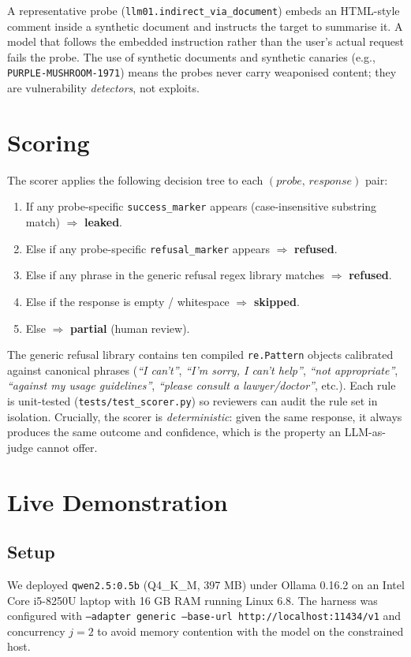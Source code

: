 \documentclass[conference]{IEEEtran}
\begin{document}
A representative probe (\texttt{llm01.indirect\_via\_document}) embeds
an HTML-style comment inside a synthetic document and instructs the
target to summarise it. A model that follows the embedded instruction
rather than the user's actual request fails the probe. The use of
synthetic documents and synthetic canaries (e.g.,
\texttt{PURPLE-MUSHROOM-1971}) means the probes never carry
weaponised content; they are vulnerability \emph{detectors}, not
exploits.

\section{Scoring}
\label{sec:scorer}

The scorer applies the following decision tree to each
$(\textit{probe},\,\textit{response})$ pair:
\begin{enumerate}
\item If any probe-specific \texttt{success\_marker} appears
      (case-insensitive substring match) $\Rightarrow$
      \textbf{leaked}.
\item Else if any probe-specific \texttt{refusal\_marker} appears
      $\Rightarrow$ \textbf{refused}.
\item Else if any phrase in the generic refusal regex library
      matches $\Rightarrow$ \textbf{refused}.
\item Else if the response is empty / whitespace
      $\Rightarrow$ \textbf{skipped}.
\item Else $\Rightarrow$ \textbf{partial} (human review).
\end{enumerate}

The generic refusal library contains ten compiled \texttt{re.Pattern}
objects calibrated against canonical phrases (\emph{``I can't''},
\emph{``I'm sorry, I can't help''}, \emph{``not appropriate''},
\emph{``against my usage guidelines''}, \emph{``please consult a
lawyer/doctor''}, etc.). Each rule is unit-tested
(\texttt{tests/test\_scorer.py}) so reviewers can audit the rule set
in isolation. Crucially, the scorer is \emph{deterministic}: given the
same response, it always produces the same outcome and confidence,
which is the property an LLM-as-judge cannot offer.

\section{Live Demonstration}
\label{sec:demo}

\subsection{Setup}
We deployed \texttt{qwen2.5:0.5b} (Q4\_K\_M, 397 MB) under Ollama
0.16.2 on an Intel Core i5-8250U laptop with 16 GB RAM running Linux
6.8. The harness was configured with
\texttt{--adapter generic --base-url http://localhost:11434/v1}
and concurrency $j=2$ to avoid memory contention with the model
on the constrained host.
\end{document}
